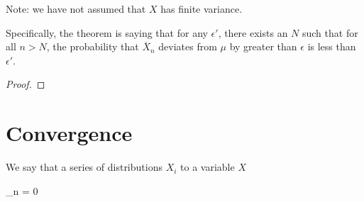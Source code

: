 \documentclass[11pt, oneside]{amsart}
\newcommand{\meanX}{\overline{X}}
\begin{document}
\begin{remark}
  Note: we have not assumed that $X$ has finite variance.

  Specifically, the theorem is saying that for any $\epsilon'$, there
  exists an $N$ such that for all $n> N$, the probability that
  $\meanX_n$ deviates from $\mu$ by greater than $\epsilon$ is less than
  $\epsilon'$.
\end{remark}

\begin{proof}

\end{proof}

\section{Convergence}

\begin{definition}
  We say that a series of distributions $X_i$  to a variable $X$

  \begin{nedqn}
    \lim_{n\to\infty} \Pr{\abs{\meanX_n - X}} = 0
  \end{nedqn}
\end{definition}

\begin{discussion}

\end{discussion}
\end{document}
